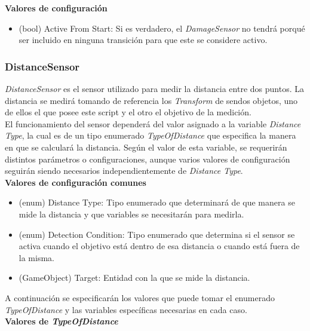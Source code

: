 \textbf{Valores de configuración}
\begin{itemize}
	\item (bool) Active From Start: Si es verdadero, el \textit{DamageSensor} no tendrá porqué ser incluido en ninguna transición para que este se considere activo.
\end{itemize}

\subsubsection{DistanceSensor}

\textit{DistanceSensor} es el sensor utilizado para medir la distancia entre dos puntos. La distancia se medirá tomando de referencia los \textit{Transform} de sendos objetos, uno de ellos el que posee este script y el otro el objetivo de la medición.\\

El funcionamiento del sensor dependerá del valor asignado a la variable \textit{Distance Type}, la cual es de un tipo enumerado \textit{TypeOfDistance} que especifica la manera en que se calculará la distancia. Según el valor de esta variable, se requerirán distintos parámetros o configuraciones, aunque varios valores de configuración seguirán siendo necesarios independientemente de \textit{Distance Type}.\\

\textbf{Valores de configuración comunes}
\begin{itemize}
	\item (enum) Distance Type: Tipo enumerado que determinará de que manera se mide la distancia y que variables se necesitarán para medirla.
	\item (enum) Detection Condition: Tipo enumerado que determina si el sensor se activa cuando el objetivo está dentro de esa distancia o cuando está fuera de la misma.
	\item (GameObject) Target: Entidad con la que se mide la distancia.
\end{itemize}

A continuación se especificarán los valores que puede tomar el enumerado \textit{TypeOfDistance} y las variables específicas necesarias en cada caso.\\

\textbf{Valores de \textit{TypeOfDistance}}


